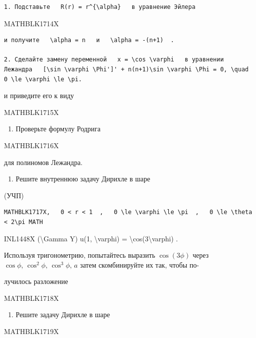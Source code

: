 \documentclass[
]{article}
\providecommand{\tightlist}{%
  \setlength{\itemsep}{0pt}\setlength{\parskip}{0pt}}
\begin{document}
{{{\begin{verbatim}
1. Подставьте   R(r) = r^{\alpha}   в уравнение Эйлера
\end{verbatim}

MATHBLK1714X

\begin{verbatim}
и получите   \alpha = n   и   \alpha = -(n+1)  .

2. Сделайте замену переменной   x = \cos \varphi   в уравнении Лежандра   [\sin \varphi \Phi']' + n(n+1)\sin \varphi \Phi = 0, \quad 0 \le \varphi \le \pi. 
\end{verbatim}

и приведите его к виду

MATHBLK1715X

\begin{enumerate}
\def\labelenumi{\arabic{enumi}.}
\setcounter{enumi}{2}
\tightlist
\item
  Проверьте формулу Родрига
\end{enumerate}

MATHBLK1716X

для полиномов Лежандра.

\begin{enumerate}
\def\labelenumi{\arabic{enumi}.}
\setcounter{enumi}{3}
\tightlist
\item
  Решите внутреннюю задачу Дирихле в шаре
\end{enumerate}

(УЧП)

\begin{verbatim}
MATHBLK1717X,   0 < r < 1  ,   0 \le \varphi \le \pi  ,   0 \le \theta < 2\pi MATH
\end{verbatim}

INL1448X (\textbackslash Gamma Y) u(1, \textbackslash varphi) =
\textbackslash cos(3\textbackslash varphi) .

Используя тригонометрию, попытайтесь выразить \(\cos{(3\phi)}\) через
\(\cos{\phi}, \, \cos^2{\phi}, \, \cos^3{\phi}, \, a\) затем
скомбинируйте их так, чтобы по-

лучилось разложение

MATHBLK1718X

\begin{enumerate}
\def\labelenumi{\arabic{enumi}.}
\setcounter{enumi}{4}
\tightlist
\item
  Решите задачу Дирихле в шаре
\end{enumerate}

MATHBLK1719X

}}}
\end{document}
